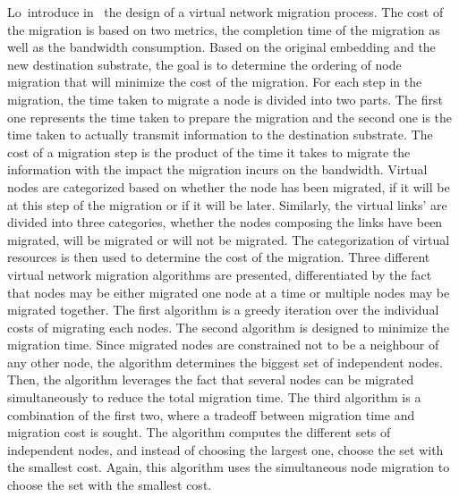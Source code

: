 Lo~\etal introduce in~\cite{vnm-lo2013} the design of a virtual network migration process.
The cost of the migration is based on two metrics, the completion time of the migration as well as the bandwidth consumption.
Based on the original embedding and the new destination substrate, the goal is to determine the ordering of node migration that will minimize the cost of the migration.
For each step in the migration, the time taken to migrate a node is divided into two parts. The first one represents the time taken to prepare the migration and the second one is the time taken to actually transmit information to the destination substrate.
The cost of a migration step is the product of the time it takes to migrate the information with the impact the migration incurs on the bandwidth.
Virtual nodes are categorized based on whether the node has been migrated, if it will be at this step of the migration or if it will be later.
Similarly, the virtual links' are divided into three categories, whether the nodes composing the links have been migrated, will be migrated or will not be migrated.
The categorization of virtual resources is then used to determine the cost of the migration.
Three different virtual network migration algorithms are presented, differentiated by the fact that nodes may be either migrated one node at a time or multiple nodes may be migrated together.
The first algorithm is a greedy iteration over the individual costs of migrating each nodes.
The second algorithm is designed to minimize the migration time. Since migrated nodes are constrained not to be a neighbour of any other node, the algorithm determines the biggest set of independent nodes.
Then, the algorithm leverages the fact that several nodes can be migrated simultaneously to reduce the total migration time.
The third algorithm is a combination of the first two, where a tradeoff between migration time and migration cost is sought. The algorithm computes the different sets of independent nodes, and instead of choosing the largest one, choose the set with the smallest cost.
Again, this algorithm uses the simultaneous node migration to choose the set with the smallest cost.

